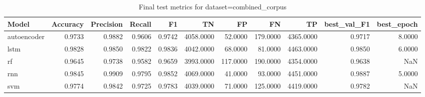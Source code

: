 \begin{table}
\caption{Final test metrics for dataset=combined_corpus}
\label{tab:final_combined_corpus}
\begin{tabular}{lrrrrrrrrrr}
\toprule
Model & Accuracy & Precision & Recall & F1 & TN & FP & FN & TP & best_val_F1 & best_epoch \\
\midrule
autoencoder & 0.9733 & 0.9882 & 0.9606 & 0.9742 & 4058.0000 & 52.0000 & 179.0000 & 4365.0000 & 0.9717 & 8.0000 \\
lstm & 0.9828 & 0.9850 & 0.9822 & 0.9836 & 4042.0000 & 68.0000 & 81.0000 & 4463.0000 & 0.9850 & 6.0000 \\
rf & 0.9645 & 0.9738 & 0.9582 & 0.9659 & 3993.0000 & 117.0000 & 190.0000 & 4354.0000 & 0.9638 & NaN \\
rnn & 0.9845 & 0.9909 & 0.9795 & 0.9852 & 4069.0000 & 41.0000 & 93.0000 & 4451.0000 & 0.9887 & 5.0000 \\
svm & 0.9774 & 0.9842 & 0.9725 & 0.9783 & 4039.0000 & 71.0000 & 125.0000 & 4419.0000 & 0.9782 & NaN \\
\bottomrule
\end{tabular}
\end{table}
